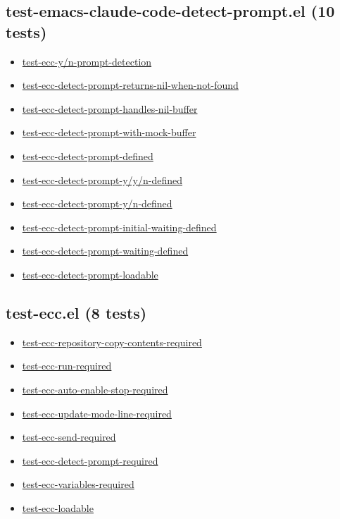 \documentclass[11pt]{article}
\begin{document}
\subsection{test-emacs-claude-code-detect-prompt.el (10 tests)}
\label{sec:orgc2a02e6}
\begin{itemize}
\item \href{test-emacs-claude-code-detect-prompt.el}{test-ecc-y/n-prompt-detection}
\item \href{test-emacs-claude-code-detect-prompt.el}{test-ecc-detect-prompt-returns-nil-when-not-found}
\item \href{test-emacs-claude-code-detect-prompt.el}{test-ecc-detect-prompt-handles-nil-buffer}
\item \href{test-emacs-claude-code-detect-prompt.el}{test-ecc-detect-prompt-with-mock-buffer}
\item \href{test-emacs-claude-code-detect-prompt.el}{test-ecc-detect-prompt-defined}
\item \href{test-emacs-claude-code-detect-prompt.el}{test-ecc-detect-prompt-y/y/n-defined}
\item \href{test-emacs-claude-code-detect-prompt.el}{test-ecc-detect-prompt-y/n-defined}
\item \href{test-emacs-claude-code-detect-prompt.el}{test-ecc-detect-prompt-initial-waiting-defined}
\item \href{test-emacs-claude-code-detect-prompt.el}{test-ecc-detect-prompt-waiting-defined}
\item \href{test-emacs-claude-code-detect-prompt.el}{test-ecc-detect-prompt-loadable}
\end{itemize}
\subsection{test-ecc.el (8 tests)}
\label{sec:org584ee57}
\begin{itemize}
\item \href{test-ecc.el}{test-ecc-repository-copy-contents-required}
\item \href{test-ecc.el}{test-ecc-run-required}
\item \href{test-ecc.el}{test-ecc-auto-enable-stop-required}
\item \href{test-ecc.el}{test-ecc-update-mode-line-required}
\item \href{test-ecc.el}{test-ecc-send-required}
\item \href{test-ecc.el}{test-ecc-detect-prompt-required}
\item \href{test-ecc.el}{test-ecc-variables-required}
\item \href{test-ecc.el}{test-ecc-loadable}
\end{itemize}
\end{document}
